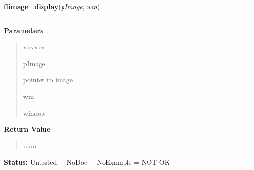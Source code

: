 \hspace{.8\funcindent}\begin{boxedminipage}{\funcwidth}

    \raggedright \textbf{flimage\_display}(\textit{pImage}, \textit{win})

    \vspace{-1.5ex}

    \rule{\textwidth}{0.5\fboxrule}
\setlength{\parskip}{2ex}
\setlength{\parskip}{1ex}
      \textbf{Parameters}
      \vspace{-1ex}

      \begin{quote}
        \begin{Ventry}{xxxxxx}

          \item[pImage]

          pointer to image

          \item[win]

          window

        \end{Ventry}

      \end{quote}

      \textbf{Return Value}
    \vspace{-1ex}

      \begin{quote}
      num

      \end{quote}

\textbf{Status:} Untested + NoDoc + NoExample = NOT OK



    \end{boxedminipage}

    \label{xformslib:library:flimage_sdisplay}

    \vspace{0.5ex}

